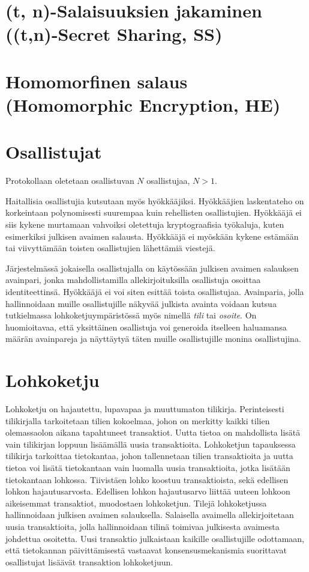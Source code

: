 \section{(t, n)-Salaisuuksien jakaminen ((t,n)-Secret Sharing, SS)}

\section{Homomorfinen salaus (Homomorphic Encryption, HE)}

\section{Osallistujat}

Protokollaan oletetaan osallistuvan $N$ osallistujaa, $N > 1$.

Haitallisia osallistujia kutsutaan myös hyökkääjiksi. Hyökkääjien laskentateho on korkeintaan polynomisesti suurempaa kuin rehellisten osallistujien. Hyökkääjä ei siis kykene murtamaan vahvoiksi oletettuja kryptograafisia työkaluja, kuten esimerkiksi julkisen avaimen salausta. Hyökkääjä ei myöskään kykene estämään tai viivyttämään toisten osallistujien lähettämiä viestejä.

Järjestelmässä jokaisella osallistujalla on käytössään julkisen avaimen salauksen avainpari, jonka mahdollistamilla allekirjoituksilla osallistuja osoittaa identiteettinsä. Hyökkääjä ei voi siten esittää toista osallistujaa. Avainparia, jolla hallinnoidaan muille osallistujille näkyvää julkista avainta voidaan kutsua tutkielmassa lohkoketjuympäristössä myös nimellä \textit{tili} tai \textit{osoite}. On huomioitavaa, että yksittäinen osallistuja voi generoida itselleen haluamansa määrän avainpareja ja näyttäytyä täten muille osallistujille monina osallistujina.

\section{Lohkoketju}

Lohkoketju on hajautettu, lupavapaa ja muuttumaton tilikirja. Perinteisesti tilikirjalla tarkoitetaan tilien kokoelmaa, johon on merkitty kaikki tilien olemassaolon aikana tapahtuneet transaktiot. Uutta tietoa on mahdollista lisätä vain tilikirjan loppuun lisäämällä uusia transaktioita. Lohkoketjun tapauksessa tilikirja tarkoittaa tietokantaa, johon tallennetaan tilien transaktioita ja uutta tietoa voi lisätä tietokantaan vain luomalla uusia transaktioita, jotka lisätään tietokantaan lohkossa. Tiivistäen lohko koostuu transaktioista, sekä edellisen lohkon hajautusarvosta. Edellisen lohkon hajautusarvo liittää uuteen lohkoon aikeisemmat transaktiot, muodostaen lohkoketjun. Tilejä lohkoketjussa hallinnoidaan julkisen avaimen salauksella. Salaisella avaimella allekirjoitetaan uusia transaktioita, jolla hallinnoidaan tilinä toimivaa julkisesta avaimesta johdettua osoitetta. Uusi transaktio julkaistaan kaikille osallistujille odottamaan, että tietokannan päivittämisestä vastaavat konsensusmekanismia suorittavat osallistujat lisäävät transaktion lohkoketjuun.

